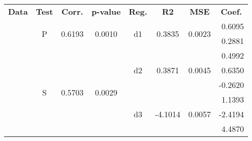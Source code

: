 \renewcommand{\arraystretch}{1.1}
\begin{tabular}{cccccccr}
\arrayrulecolor{table-color}\hline
\textbf{Data}                                            & \textbf{Test}      & \textbf{Corr.}          & \textbf{p-value}        & \textbf{Reg.}       & \textbf{R2}               & \textbf{MSE}            & \multicolumn{1}{c}{\textbf{Coef.}} \\ \arrayrulecolor{table-color}\hline
\multirow{9}{*}{{ \bf Original}}                         & \multirow{2}{*}{P} & \multirow{2}{*}{0.6193} & \multirow{2}{*}{0.0010} & \multirow{2}{*}{d1} & \multirow{2}{*}{0.3835}  & \multirow{2}{*}{0.0023} & 0.6095                \\
                                                         &                    &                         &                         &                     &                           &                         & 0.2881                \\ \arrayrulecolor{color-three-light}\cline{2-8} 
                                                         & \multirow{7}{*}{S} & \multirow{7}{*}{0.5703} & \multirow{7}{*}{0.0029} & \multirow{3}{*}{d2} & \multirow{3}{*}{0.3871} & \multirow{3}{*}{0.0045} & 0.4992                \\
                                                         &                    &                         &                         &                     &                           &                         & 0.6350                \\
                                                         &                    &                         &                         &                     &                           &                         & -0.2620               \\ \arrayrulecolor{color-three-light}\cline{5-8} 
                                                         &                    &                         &                         & \multirow{4}{*}{d3} & \multirow{4}{*}{-4.1014} & \multirow{4}{*}{0.0057} & 1.1393                \\
                                                         &                    &                         &                         &                     &                           &                         & -2.4194               \\
                                                         &                    &                         &                         &                     &                           &                         & 4.4870                \\

\end{tabular}
